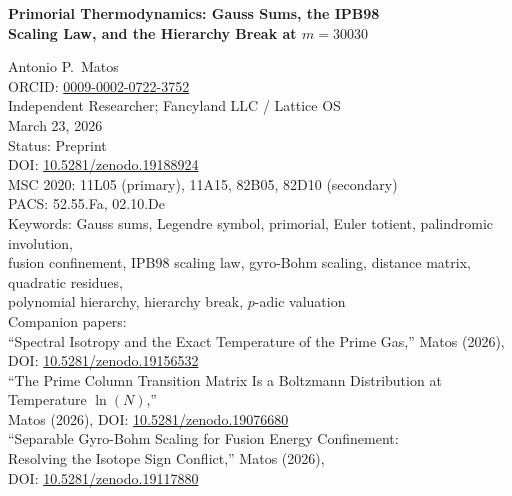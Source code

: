 \documentclass[11pt,letterpaper]{article}
\theoremstyle{definition}
\begin{document}
\begin{center}
{\LARGE\bfseries Primorial Thermodynamics: Gauss Sums, the IPB98\\[0.3em] Scaling Law, and the Hierarchy Break at $m = 30030$}

\vspace{1.5em}

{\large Antonio P.\ Matos}\\[0.5em]
\small ORCID: \href{https://orcid.org/0009-0002-0722-3752}{0009-0002-0722-3752}\\[0.3em]
\small Independent Researcher; Fancyland LLC / Lattice OS\\[0.3em]
\small March 23, 2026\\[0.3em]
\small Status: Preprint\\[0.3em]
\small DOI: \href{https://doi.org/10.5281/zenodo.19188924}{10.5281/zenodo.19188924}\\[0.3em]
\small MSC 2020: 11L05 (primary), 11A15, 82B05, 82D10 (secondary)\\[0.3em]
\small PACS: 52.55.Fa, 02.10.De\\[0.3em]
\small Keywords: Gauss sums, Legendre symbol, primorial, Euler totient, palindromic involution,\\
\small fusion confinement, IPB98 scaling law, gyro-Bohm scaling, distance matrix, quadratic residues,\\
\small polynomial hierarchy, hierarchy break, $p$-adic valuation\\[0.8em]
\small Companion papers:\\[0.3em]
\small ``Spectral Isotropy and the Exact Temperature of the Prime Gas,'' Matos (2026),\\
DOI: \href{https://doi.org/10.5281/zenodo.19156532}{10.5281/zenodo.19156532}\\[0.3em]
\small ``The Prime Column Transition Matrix Is a Boltzmann Distribution at Temperature $\ln(N)$,''\\
Matos (2026), DOI: \href{https://doi.org/10.5281/zenodo.19076680}{10.5281/zenodo.19076680}\\[0.3em]
\small ``Separable Gyro-Bohm Scaling for Fusion Energy Confinement:\\
Resolving the Isotope Sign Conflict,'' Matos (2026),\\
DOI: \href{https://doi.org/10.5281/zenodo.19117880}{10.5281/zenodo.19117880}
\end{center}

\vspace{0.8em}
\end{document}
